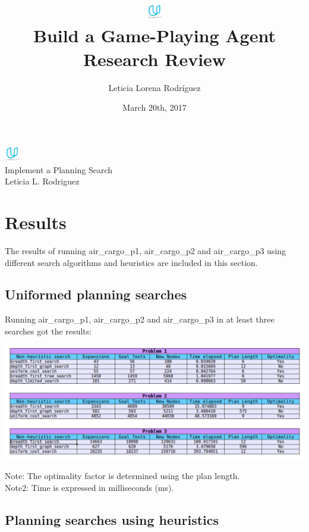 \documentclass[10pt, a4paper,english]{article}
\author{\normalsize{Leticia Lorena Rodr\'iguez}}
\date{\normalsize{March 20th, 2017}} %
\title{
	\includegraphics[width=0.05\textwidth]{udacity-small.png}\\
Build a Game-Playing Agent \\
\large {Research Review}
} %
\begin{document}
\begin{center}

\includegraphics[width=0.05\textwidth]{udacity-small.png}\\
Implement a Planning Search \\
Leticia L. Rodriguez \\
\end{center}



\section{Results}

The results of running air\_cargo\_p1, air\_cargo\_p2 and air\_cargo\_p3 using different search algorithms and heuristics are included in this section.


\subsection{Uniformed planning searches}

Running air\_cargo\_p1, air\_cargo\_p2 and air\_cargo\_p3 in at least three searches got the results:
\begin{center}
\includegraphics[width=1\textwidth]{nonheuristic.png}\\
\end{center}

\begin{scriptsize}
Note: The optimality factor is determined using the plan length.\\
\indent Note2: Time is expressed in milliseconds (ms).
\end{scriptsize}

\subsection{Planning searches using heuristics}
\end{document}
